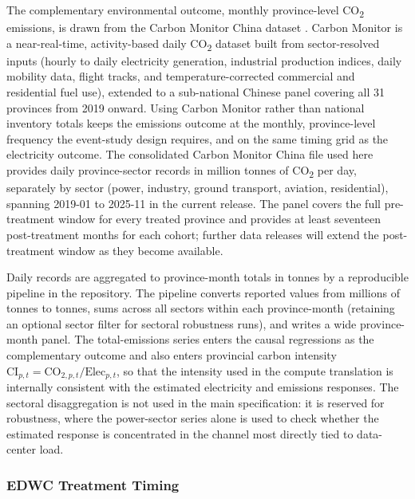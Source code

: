 \documentclass[12pt,a4paper]{article}
\begin{document}
The complementary environmental outcome, monthly province-level
CO\textsubscript{2} emissions, is drawn from the Carbon Monitor China
dataset \citep{liuetal-2020-carbonmonitornearrealtimea}. Carbon
Monitor is a near-real-time, activity-based daily CO\textsubscript{2}
dataset built from sector-resolved inputs (hourly to daily
electricity generation, industrial production indices, daily mobility
data, flight tracks, and temperature-corrected commercial and
residential fuel use), extended to a sub-national Chinese panel
covering all 31 provinces from 2019 onward. Using Carbon Monitor
rather than national inventory totals keeps the emissions outcome at
the monthly, province-level frequency the event-study design
requires, and on the same timing grid as the electricity outcome. The
consolidated Carbon Monitor China file used here provides daily
province-sector records in million tonnes of CO\textsubscript{2} per
day, separately by sector (power, industry, ground transport,
aviation, residential), spanning 2019-01 to 2025-11 in the current
release. The panel covers the full pre-treatment window for every
treated province and provides at least seventeen post-treatment
months for each cohort; further data releases will extend the
post-treatment window as they become available.

Daily records are aggregated to province-month totals in tonnes by a
reproducible pipeline in the repository. The pipeline converts
reported values from millions of tonnes to tonnes, sums across all
sectors within each province-month (retaining an optional sector
filter for sectoral robustness runs), and writes a wide
province-month panel. The total-emissions series enters the causal
regressions as the complementary outcome and also enters provincial
carbon intensity $\text{CI}_{p,t} = \text{CO}_{2,p,t} /
\text{Elec}_{p,t}$, so that the intensity used in the compute
translation is internally consistent with the estimated electricity
and emissions responses. The sectoral disaggregation is not used in
the main specification: it is reserved for robustness, where the
power-sector series alone is used to check whether the estimated
response is concentrated in the channel most directly tied to
data-center load.

\subsubsection{EDWC Treatment Timing}
%
\end{document}
